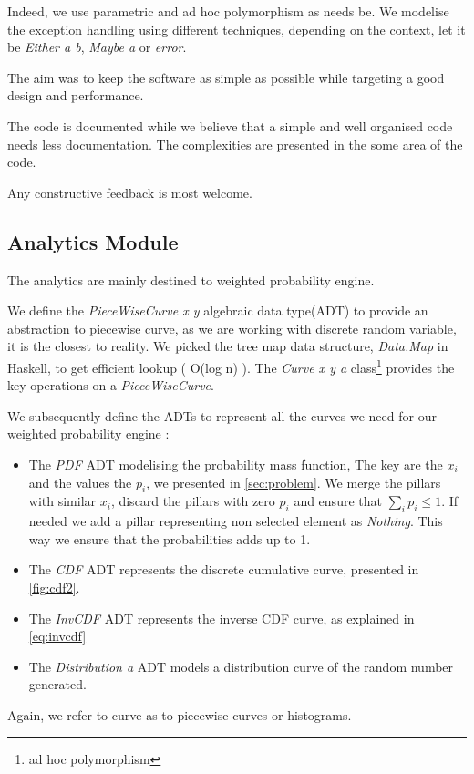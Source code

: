 \documentclass[12pt,a4paper,article]{memoir} %
\begin{document}
Indeed, we use parametric and ad hoc polymorphism as needs be.
We modelise the exception handling using different techniques, depending on
the context, let it be \emph{Either a b}, \emph{Maybe a} or \emph{error}. 

The aim was to keep the software as simple as possible while targeting a
good design and performance. 

The code is documented while we believe that a simple and well organised
code needs less documentation. The complexities are presented in the some
area of the code. 

Any constructive feedback is most welcome.

\subsection{Analytics Module}

The analytics are mainly destined to weighted probability engine.

We define the \emph{PieceWiseCurve x y} algebraic data type(ADT) to provide an
abstraction to piecewise curve, as we are working with discrete
random variable, it is the closest to reality. We picked the tree map data
structure, \emph{Data.Map} in Haskell, to get efficient lookup ( O(log n) ).
The \emph{Curve x y a} class\footnote{ad hoc polymorphism} 
provides the key operations on a 
\emph{PieceWiseCurve}.  

We subsequently define the ADTs to represent all the curves we need
for our weighted probability engine :
\begin{itemize}
	\item The \emph{PDF} ADT modelising the probability mass function,
	The key are the $x_i$ and the values the $p_i$, we presented in
	\autoref{sec:problem}.
	We merge the pillars with similar $x_i$, discard the pillars with zero
	$p_i$ and ensure that $\sum_i p_i \leq 1$.
	If needed we add a pillar representing non selected element 
	as \emph{Nothing}. This way we ensure that the probabilities
	adds up to 1.
	\item The \emph{CDF} ADT represents the discrete cumulative
	curve, presented in \autoref{fig:cdf2}.
	\item The \emph{InvCDF} ADT represents the inverse CDF curve,
	as explained in \autoref{eq:invcdf}
	\item The \emph{Distribution a} ADT models a distribution curve
	of the random number generated.
\end{itemize}
Again, we refer to curve as to piecewise curves or histograms.
\end{document}
